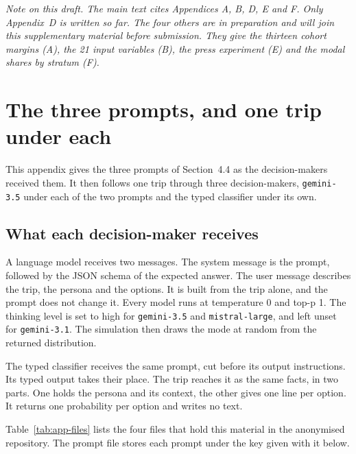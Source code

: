\setcounter{section}{3}
\renewcommand{\thetable}{\thesection.\arabic{table}}
\setcounter{table}{0}

\noindent\emph{Note on this draft. The main text cites Appendices A, B, D, E and F. Only
Appendix~D is written so far. The four others are in preparation and will join this
supplementary material before submission. They give the thirteen cohort margins (A), the 21
input variables (B), the press experiment (E) and the modal shares by stratum (F).}

\section{The three prompts, and one trip under each}
\label{app:prompts}

This appendix gives the three prompts of Section~4.4 as the decision-makers received them.
It then follows one trip through three decision-makers, \texttt{gemini-3.5} under each of the
two prompts and the typed classifier under its own.

\subsection{What each decision-maker receives}
\label{app:receives}

A language model receives two messages. The system message is the prompt, followed by the
JSON schema of the expected answer. The user message describes the trip, the persona and the
options. It is built from the trip alone, and the prompt does not change it. Every model runs
at temperature 0 and top-p 1. The thinking level is set to high for \texttt{gemini-3.5} and
\texttt{mistral-large}, and left unset for \texttt{gemini-3.1}. The simulation then draws the
mode at random from the returned distribution.

The typed classifier receives the same prompt, cut before its output instructions. Its typed
output takes their place. The trip reaches it as the same facts, in two parts. One holds the
persona and its context, the other gives one line per option. It returns one probability per
option and writes no text.

Table~\ref{tab:app-files} lists the four files that hold this material in the anonymised
repository. The prompt file stores each prompt under the key given with it below.

